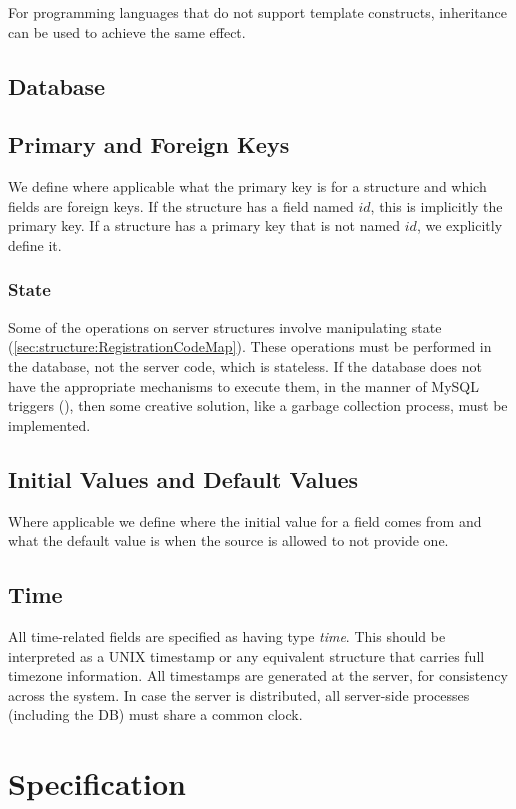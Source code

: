 \documentclass[a4paper,10pt,draft]{article}
\begin{document}
For programming languages that do not support template constructs, inheritance can be used to achieve the same effect.

\subsection{Database}

\subsection{Primary and Foreign Keys}
We define where applicable what the primary key is for a structure and which fields are foreign keys. If the structure has a field named $id$, this is implicitly the primary key. 
If a structure has a primary key that is not named $id$, we explicitly define it.

\subsubsection{State}
Some of the operations on server structures involve manipulating state (\ref{sec:structure:RegistrationCodeMap}). These operations must be performed in the database, not the 
server code, which is stateless. If the database does not have the appropriate mechanisms to execute them, in the manner of MySQL triggers (\cite{mysql_trigger}), then some 
creative solution, like a garbage collection process, must be implemented.

\subsection{Initial Values and Default Values}
Where applicable we define where the initial value for a field comes from and what the default value is when the source is allowed to not provide one.

\subsection{Time}
All time-related fields are specified as having type {\em time}. This should be interpreted as a UNIX timestamp or any equivalent structure that carries full timezone information. 
All timestamps are generated at the server, for consistency across the system. In case the server is distributed, all server-side processes (including the DB) must share a common 
clock.

\section{Specification}
\end{document}
